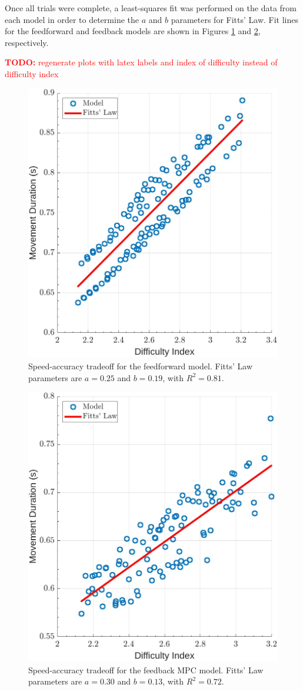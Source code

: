 \documentclass[letterpaper, 10pt, conference]{ieeeconf}
\newcommand{\todo}[1]{\textcolor{red}{\textbf{TODO:} #1}}
\begin{document}
Once all trials were complete, a least-squares fit was performed on the data from each model in order to determine the $a$ and $b$ parameters for Fitts' Law. Fit lines for the feedforward and feedback models are shown in Figures \ref{fig:FittsLawSingle} and \ref{fig:FittsLawMPC}, respectively.   

\todo{regenerate plots with latex labels and index of difficulty instead of difficulty index}
\begin{figure}[h]
    \centering
    \includegraphics[width=0.8\linewidth]{images/final_fitts_law_single.jpg}
    \caption{Speed-accuracy tradeoff for the feedforward model. Fitts' Law parameters are $a = 0.25$ and $b = 0.19$, with $R^2 = 0.81$.}
    \label{fig:FittsLawSingle}
\end{figure}

\begin{figure}[h]
    \centering
    \includegraphics[width=0.8\linewidth]{images/final_fitts_law_mpc.jpg}
    \caption{Speed-accuracy tradeoff for the feedback MPC model. Fitts' Law parameters are $a = 0.30$ and $b = 0.13$, with $R^2 = 0.72$.}
    \label{fig:FittsLawMPC}
\end{figure}
\end{document}
